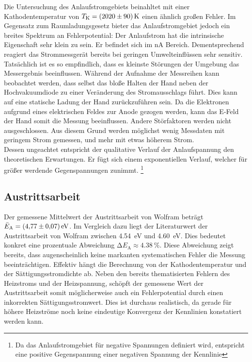 Die Untersuchung des Anlaufstromgebiets beinahltet mit einer Kathodentemperatur von $T_\text{K} = \qty{2020\pm90}{\kelvin}$ einen ähnlich 
großen Fehler. Im Gegensatz zum Raumladungsgesetz bieter das Anlaufstromgebiet jedoch ein breites Spektrum an Fehlerpotential:
Der Anlaufstrom hat die intrinsische Eigenschaft sehr klein zu sein. Er befindet sich im \unit{\nano \ampere} Bereich. 
Dementsprechend reagiert das Strommessgerät bereits bei geringen Umwelteinflüssen sehr sensitiv. Tatsächlich ist es so empfindlich, dass es kleinste Störungen 
der Umgebung das Messergebnis beeinflussen. Während der Aufnahme der Messreihen kann beobachtet werden, dass selbst das 
bloße Halten der Hand neben der Hochvakuumdiode zu einer Veränderung des Stromausschlags führt. Dies kann auf eine statische 
Ladung der Hand zurückzuführen sein. Da die Elektronen aufgrund eines elektrischen Feldes zur Anode gezogen werden, kann das 
E-Feld der Hand somit die Messung beeinflussen. Andere Störfaktoren werden nicht ausgeschlossen. Aus diesem Grund werden 
möglichst wenig Messdaten mit geringem Strom gemessen, und mehr mit etwas höherem Strom. \\
\noindent Dessen ungeachtet entspricht der qualitative Verlauf der Anlaufspannung den theoretischen Erwartungen. Er fügt sich 
einem exponentiellen Verlauf, welcher für größer werdende Gegenspannungen zunimmt. \footnote{Da das Anlaufstromgebiet für 
negative Spannungen definiert wird, entspricht eine positive Gegenspannung einer negativen Spannung der Kennlinie} 


\subsection{Austrittsarbeit}

Der gemessene Mittelwert der Austrittsarbeit von Wolfram beträgt $\bar{E}_\text{A} = \qty{4.77\pm0.07}{\electronvolt}$. Im Vergleich dazu 
liegt der Literaturwert der Austrittsarbeit von Wolfram zwischen \qty{4.54}{\electronvolt} und \qty{4.60}{\electronvolt}\cite{Austrittsarbeit}.
Dies bedeutet konkret eine prozentuale Abweichung $\increment{}E_\text{A} \approx \qty{4.38}{\percent}$. Diese Abweichung zeigt bereits, dass augenscheinlich keine 
markanten systematischen Fehler die Messung beeinträchtigen. Effektiv hängt die Berechnung von der Kathodentemperatur und der Sättigungsstromdichte ab.
Neben den bereits thematisierten Fehlern des Heizstroms und der Heizspannung, schöpft der gemessene Wert der Austrittsarbeit somit möglicherweise 
auch ein Fehlerpotential durch einen inkorrekten Sättigungsstromwert. Dies ist durchaus realistisch, da gerade für höhere Heizströme noch keine 
eindeutige Konvergenz der Kennlinien konstatiert werden kann.

